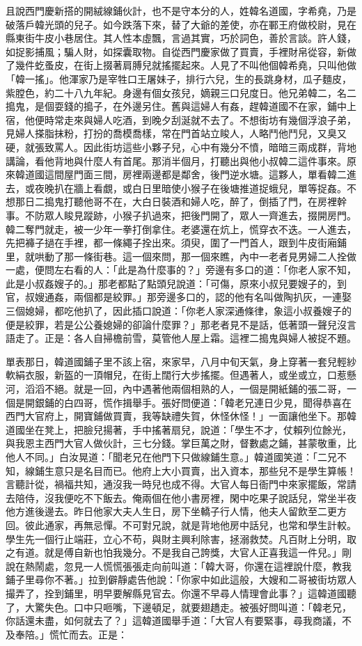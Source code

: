 \begin{showcontents}{}
且說西門慶新搭的開絨線鋪伙計，也不是守本分的人，姓韓名道國，字希堯，乃是破落戶韓光頭的兒子。如今跌落下來，替了大爺的差使，亦在鄆王府做校尉，見在縣東街牛皮小巷居住。其人性本虛飄，言過其實，巧於詞色，善於言談。許人錢，如捉影捕風；騙人財，如探囊取物。自從西門慶家做了買賣，手裡財帛從容，新做了幾件虼蚤皮，在街上掇著肩膊兒就搖擺起來。人見了不叫他個韓希堯，只叫他做「韓一搖」。他渾家乃是宰牲口王屠妹子，排行六兒，生的長跳身材，瓜子麵皮，紫膛色，約二十八九年紀。身邊有個女孩兒，嫡親三口兒度日。他兄弟韓二，名二搗鬼，是個耍錢的搗子，在外邊另住。舊與這婦人有姦，趕韓道國不在家，鋪中上宿，他便時常走來與婦人吃酒，到晚夕刮涎就不去了。不想街坊有幾個浮浪子弟，見婦人搽脂抹粉，打扮的喬模喬樣，常在門首站立睃人，人略鬥他鬥兒，又臭又硬，就張致罵人。因此街坊這些小夥子兒，心中有幾分不憤，暗暗三兩成群，背地講論，看他背地與什麼人有首尾。那消半個月，打聽出與他小叔韓二這件事來。原來韓道國這間屋門面三間，房裡兩邊都是鄰舍，後門逆水塘。這夥人，單看韓二進去，或夜晚扒在牆上看覷，或白日里暗使小猴子在後塘推道捉蛾兒，單等捉姦。不想那日二搗鬼打聽他哥不在，大白日裝酒和婦人吃，醉了，倒插了門，在房裡幹事。不防眾人睃見蹤跡，小猴子扒過來，把後門開了，眾人一齊進去，掇開房門。韓二奪門就走，被一少年一拳打倒拿住。老婆還在炕上，慌穿衣不迭。一人進去，先把褲子撾在手裡，都一條繩子拴出來。須臾，圍了一門首人，跟到牛皮街廂鋪里，就哄動了那一條街巷。這一個來問，那一個來瞧，內中一老者見男婦二人拴做一處，便問左右看的人：「此是為什麼事的？」旁邊有多口的道：「你老人家不知，此是小叔姦嫂子的。」那老都點了點頭兒說道：「可傷，原來小叔兒要嫂子的，到官，叔嫂通姦，兩個都是絞罪。」那旁邊多口的，認的他有名叫做陶扒灰，一連娶三個媳婦，都吃他扒了，因此插口說道：「你老人家深通條律，象這小叔養嫂子的便是絞罪，若是公公養媳婦的卻論什麼罪？」那老者見不是話，低著頭一聲兒沒言語走了。正是：各人自掃檐前雪，莫管他人屋上霜。這裡二搗鬼與婦人被捉不題。

單表那日，韓道國鋪子里不該上宿，來家早，八月中旬天氣，身上穿著一套兒輕紗軟絹衣服，新盔的一頂帽兒，在街上闊行大步搖擺。但遇著人，或坐或立，口惹懸河，滔滔不絕。就是一回，內中遇著他兩個相熟的人，一個是開紙鋪的張二哥，一個是開銀鋪的白四哥，慌作揖舉手。張好問便道：「韓老兄連日少見，聞得恭喜在西門大官府上，開寶鋪做買賣，我等缺禮失賀，休怪休怪！」一面讓他坐下。那韓道國坐在凳上，把臉兒揚著，手中搖著扇兒，說道：「學生不才，仗賴列位餘光，與我恩主西門大官人做伙計，三七分錢。掌巨萬之財，督數處之鋪，甚蒙敬重，比他人不同。」白汝晃道：「聞老兄在他門下只做線鋪生意。」韓道國笑道：「二兄不知，線鋪生意只是名目而已。他府上大小買賣，出入資本，那些兒不是學生算帳！言聽計從，禍福共知，通沒我一時兒也成不得。大官人每日衙門中來家擺飯，常請去陪侍，沒我便吃不下飯去。俺兩個在他小書房裡，閑中吃果子說話兒，常坐半夜他方進後邊去。昨日他家大夫人生日，房下坐轎子行人情，他夫人留飲至二更方回。彼此通家，再無忌憚。不可對兄說，就是背地他房中話兒，也常和學生計較。學生先一個行止端莊，立心不苟，與財主興利除害，拯溺救焚。凡百財上分明，取之有道。就是傅自新也怕我幾分。不是我自己誇獎，大官人正喜我這一件兒。」剛說在熱鬧處，忽見一人慌慌張張走向前叫道：「韓大哥，你還在這裡說什麼，教我鋪子里尋你不著。」拉到僻靜處告他說：「你家中如此這般，大嫂和二哥被街坊眾人撮弄了，拴到鋪里，明早要解縣見官去。你還不早尋人情理會此事？」這韓道國聽了，大驚失色。口中只咂嘴，下邊頓足，就要翅趫走。被張好問叫道：「韓老兄，你話還未盡，如何就去了？」這韓道國舉手道：「大官人有要緊事，尋我商議，不及奉陪。」慌忙而去。正是：


\end{showcontents}
